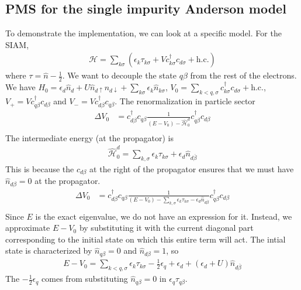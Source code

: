 \subsection{PMS for the single impurity Anderson model}
To demonstrate the implementation, we can look at a specific model. For the SIAM,
\begin{equation}\begin{aligned}
	\mathcal{H} = \sum_{k\sigma}\left(\epsilon_k \tau_{k\sigma} + V c^\dagger_{k\sigma}c_{d\sigma} + \text{h.c.}\right)
\end{aligned}\end{equation}
where \(\tau = \hat n - \frac{1}{2}\). We want to decouple the state \(q\beta\) from the rest of the electrons. We have \({H}_0 = \epsilon_d\hat n_d + U \hat n_{d\uparrow}n_{d\downarrow} + \sum_{k\sigma} \epsilon_k \hat n_{k\sigma}\), \(V_0 = \sum_{k<q,\sigma}c^\dagger_{k\sigma}c_{d\sigma}+\text{h.c.}\), \(V_+ = V c^\dagger_{q\beta}c_{d\beta}\) and \(V_- = V c^\dagger_{d\beta}c_{q\beta}\). The renormalization in particle sector
\begin{equation}\begin{aligned}
	\Delta V_0 &=  c^\dagger_{d\beta}c_{q\beta}\frac{1}{\left(E - V_0\right) - \hat{\mathcal{H}}^d_0}c^\dagger_{q\beta}c_{d\beta}\\
\end{aligned}\end{equation}
The intermediate energy (at the propagator) is
\begin{equation}\begin{aligned}
	\hat{\mathcal{H}}^d_0 = \sum_{k,\sigma}\epsilon_k \tau_{k\sigma} + \epsilon_d \hat n_{d\overline\beta}
\end{aligned}\end{equation}
This is because the \(c_{d\beta}\) at the right of the propagator ensures that we must have \(\hat n_{d\beta}=0\) at the propagator.
\begin{equation}\begin{aligned}
	\Delta V_0 &=  c^\dagger_{d\beta}c_{q\beta}\frac{1}{\left(E - V_0\right) - \sum_{k,\sigma}\epsilon_k \tau_{k\sigma} - \epsilon_d \hat n_{d\overline\beta}}c^\dagger_{q\beta}c_{d\beta}\\
\end{aligned}\end{equation}
Since \(E\) is the exact eigenvalue, we do not have an expression for it. Instead, we approximate \(E - V_0\) by substituting it with the current diagonal part corresponding to the initial state on which this entire term will act. The intial state is characterized by \(\hat n_{q\beta}=0\) and \(\hat n_{d\beta} = 1\), so
\begin{equation}\begin{aligned}
	E - V_0= \sum_{k<q,\sigma}\epsilon_k \tau_{k\sigma} - \frac{1}{2}\epsilon_q + \epsilon_d + \left(\epsilon_d + U\right)\hat n_{d\overline\beta}
\end{aligned}\end{equation}
The \(- \frac{1}{2}\epsilon_q\) comes from substituting \(\hat n_{q\beta}=0\) in \(\epsilon_q \tau_{q\beta}\).

